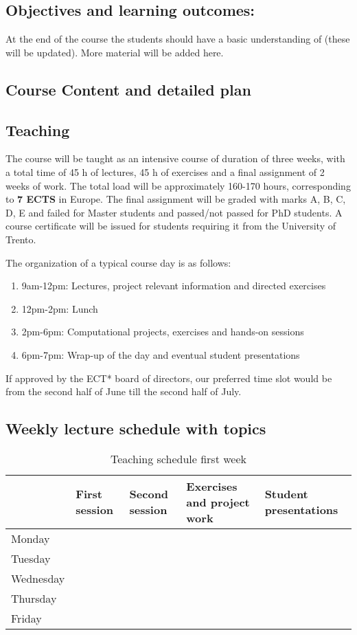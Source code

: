 \documentclass[superscriptaddress,amsmath,amssymb,aps,floatfix]{revtex4-2}
\begin{document}
\subsection{Objectives and learning outcomes:}

At the end of the course the students should have a basic
understanding of (these will be updated). More material will be added
here.

\subsection{Course Content and detailed plan}

\subsection{Teaching}\label{teaching}

The course will be taught as an intensive course of duration of three
weeks, with a total time of 45 h of lectures, 45 h of exercises and a
final assignment of 2 weeks of work. The total load will be
approximately 160-170 hours, corresponding to \textbf{7 ECTS} in
Europe.  The final assignment will be graded with marks A, B, C, D, E
and failed for Master students and passed/not passed for PhD
students. A course certificate will be issued for students requiring
it from the University of Trento.

The organization of a typical course day is as follows:

\begin{enumerate}
\def\labelenumi{\arabic{enumi}.}
\item
  9am-12pm: Lectures, project relevant information and directed
  exercises
\item
  12pm-2pm: Lunch
\item
  2pm-6pm: Computational projects, exercises and hands-on sessions
\item
  6pm-7pm: Wrap-up of the day and eventual student presentations
\end{enumerate}

If approved by the ECT* board of directors, our preferred time slot
would be from the second half of June till the second half of July.


\subsection{Weekly lecture schedule with topics}

\begin{table}[hbtp]
\begin{tabular}{|l|l|l|l|l|} \hline
    & First session  & Second session  & Exercises and project work & Student presentations \\ \hline
  Monday & & & & \\
  Tuesday & & & & \\
  Wednesday & & & & \\
  Thursday & & & & \\
  Friday & & & & \\ \hline
\end{tabular}
\caption{Teaching schedule first week}
\end{table}
\end{document}
